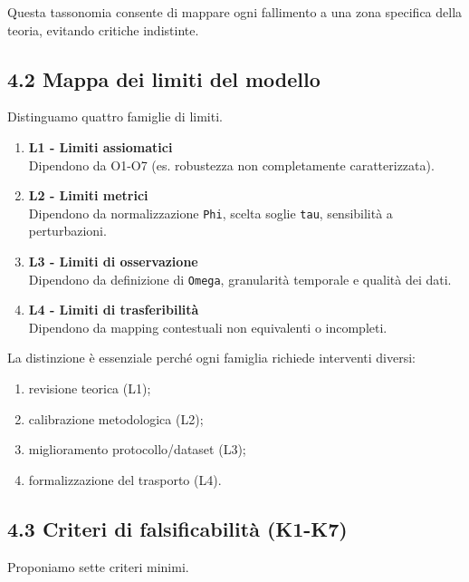 Questa tassonomia consente di mappare ogni fallimento a una zona specifica della teoria, evitando critiche indistinte.

\subsection{4.2 Mappa dei limiti del modello}

Distinguamo quattro famiglie di limiti.

\begin{enumerate}
\def\labelenumi{\arabic{enumi}.}
\item
  \textbf{L1 - Limiti assiomatici}\\
  Dipendono da O1-O7 (es. robustezza non completamente caratterizzata).
\item
  \textbf{L2 - Limiti metrici}\\
  Dipendono da normalizzazione \texttt{Phi}, scelta soglie \texttt{tau}, sensibilità a perturbazioni.
\item
  \textbf{L3 - Limiti di osservazione}\\
  Dipendono da definizione di \texttt{Omega}, granularità temporale e qualità dei dati.
\item
  \textbf{L4 - Limiti di trasferibilità}\\
  Dipendono da mapping contestuali non equivalenti o incompleti.
\end{enumerate}

La distinzione è essenziale perché ogni famiglia richiede interventi diversi:

\begin{enumerate}
\def\labelenumi{\arabic{enumi}.}
\tightlist
\item
  revisione teorica (L1);
\item
  calibrazione metodologica (L2);
\item
  miglioramento protocollo/dataset (L3);
\item
  formalizzazione del trasporto (L4).
\end{enumerate}

\subsection{4.3 Criteri di falsificabilità (K1-K7)}

Proponiamo sette criteri minimi.

